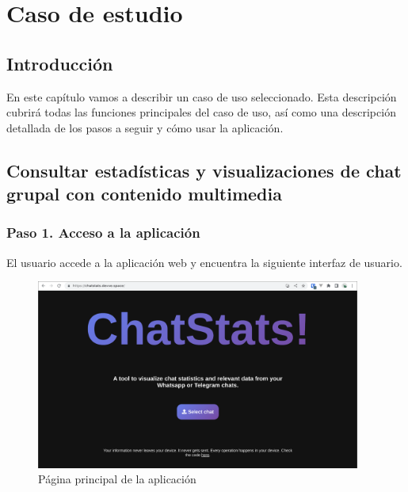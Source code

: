 \chapter{Caso de estudio}
\label{chap:case-study}

\section{Introducción}
\label{sec:5:introduction}

En este capítulo vamos a describir un caso de uso seleccionado. Esta descripción cubrirá todas las funciones principales del caso de uso, así como una descripción detallada de los pasos a seguir y cómo usar la aplicación.

\section{Consultar estadísticas y visualizaciones de chat grupal con contenido multimedia}



\subsection{Paso 1. Acceso a la aplicación}

El usuario accede a la aplicación web y encuentra la siguiente interfaz de usuario.

\begin{figure}[H]
	\centering
	\includegraphics[width=0.95\textwidth]{img/study_case/step1.png}
	\caption{Página principal de la aplicación}
	\label{fig:chap5:step_1}
\end{figure}

